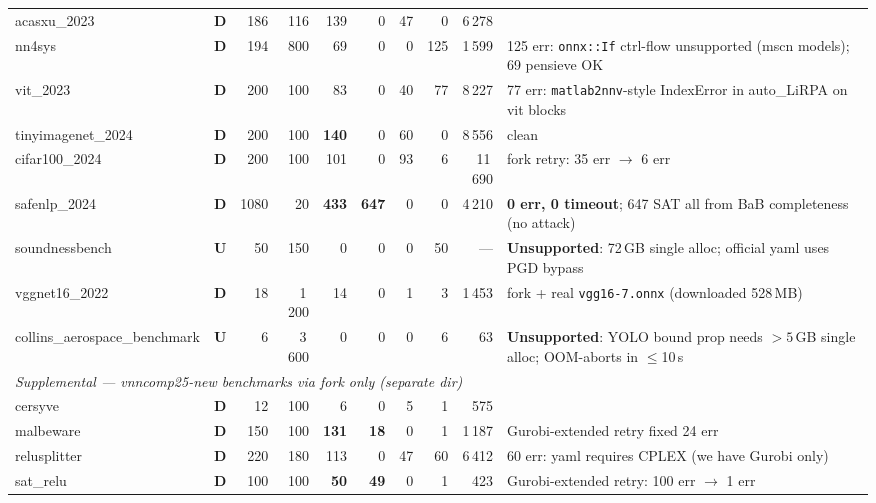 \documentclass[10pt]{beamer}
\newcommand{\sdone}{{\color{cdone}\textbf{D}}}
\newcommand{\sunsup}{{\color{cunsup}\textbf{U}}}
\begin{document}
\begin{frame}[fragile]
\begin{tabular}{l c r r r r r r r l}
acasxu\_2023                    & \sdone  & 186  & 116  & 139  & 0   & 47  & 0  & 6\,278  & \\
nn4sys                          & \sdone  & 194  & 800  & 69   & 0   & 0   & 125 & 1\,599 & 125 err: \texttt{onnx::If} ctrl-flow unsupported (mscn models); 69 pensieve OK \\
vit\_2023                       & \sdone  & 200  & 100  & 83   & 0   & 40  & 77  & 8\,227  & 77 err: \texttt{matlab2nnv}-style IndexError in auto\_LiRPA on vit blocks \\
tinyimagenet\_2024              & \sdone  & 200  & 100  & \textbf{140} & 0 & 60 & 0 & 8\,556 & clean \\
cifar100\_2024                  & \sdone  & 200  & 100  & 101  & 0   & 93  & 6   & 11\,690 & fork retry: 35 err $\to$ 6 err \\
safenlp\_2024                   & \sdone  & 1080 & 20   & \textbf{433} & \textbf{647} & 0 & 0 & 4\,210 & \textbf{0 err, 0 timeout}; 647 SAT all from BaB completeness (no attack) \\
soundnessbench                  & \sunsup & 50   & 150  & 0    & 0   & 0   & 50  & ---     & \textbf{Unsupported}: 72\,GB single alloc; official yaml uses PGD bypass \\
vggnet16\_2022                  & \sdone  & 18   & 1\,200 & 14 & 0   & 1   & 3   & 1\,453  & fork + real \texttt{vgg16-7.onnx} (downloaded 528\,MB) \\
collins\_aerospace\_benchmark   & \sunsup & 6    & 3\,600 & 0  & 0   & 0   & 6   & 63      & \textbf{Unsupported}: YOLO bound prop needs $>5$\,GB single alloc; OOM-aborts in $\le$10\,s \\
\midrule
\multicolumn{10}{l}{\textit{Supplemental — vnncomp25-new benchmarks via fork only (separate dir)}} \\
cersyve                         & \sdone  & 12   & 100  & 6    & 0   & 5   & 1   & 575     & \\
malbeware                       & \sdone  & 150  & 100  & \textbf{131} & \textbf{18} & 0 & 1 & 1\,187 & Gurobi-extended retry fixed 24 err \\
relusplitter                    & \sdone  & 220  & 180  & 113  & 0   & 47  & 60  & 6\,412  & 60 err: yaml requires CPLEX (we have Gurobi only) \\
sat\_relu                       & \sdone  & 100  & 100  & \textbf{50} & \textbf{49} & 0 & 1 & 423 & Gurobi-extended retry: 100 err $\to$ 1 err \\
\bottomrule
\end{tabular}


\end{frame}
\end{document}
